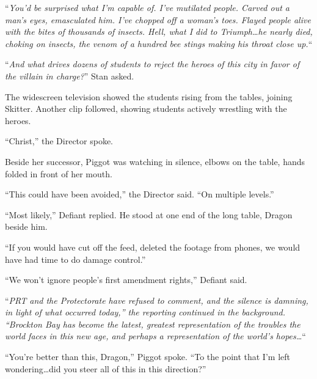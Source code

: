 \sectionbreak



``\emph{You'd be surprised what I'm capable of.  I've mutilated people.  Carved out a man's eyes, emasculated him.  I've chopped off a woman's toes.  Flayed people alive with the bites of thousands of insects.  Hell, what I did to Triumph\ldots he nearly died, choking on insects, the venom of a hundred bee stings making his throat close up.}``



``\emph{And what drives dozens of students to reject the heroes of this city in favor of the villain in charge?}''  Stan asked.



The widescreen television showed the students rising from the tables, joining Skitter.  Another clip followed, showing students actively wrestling with the heroes.



``Christ,'' the Director spoke.



Beside her successor, Piggot was watching in silence, elbows on the table, hands folded in front of her mouth.



``This could have been avoided,'' the Director said.  ``On multiple levels.''



``Most likely,'' Defiant replied.  He stood at one end of the long table, Dragon beside him.



``If you would have cut off the feed, deleted the footage from phones, we would have had time to do damage control.''



``We won't ignore people's first amendment rights,'' Defiant said.



``\emph{\ldotsThe PRT and the Protectorate have refused to comment, and the silence is damning, in light of what occurred today,'' the reporting continued in the background.  ``Brockton Bay has become the latest, greatest representation of the troubles the world faces in this new age, and perhaps a representation of the world's hopes\ldots}``



``You're better than this, Dragon,'' Piggot spoke.  ``To the point that I'm left wondering\ldots did you steer all of this in this direction?''



